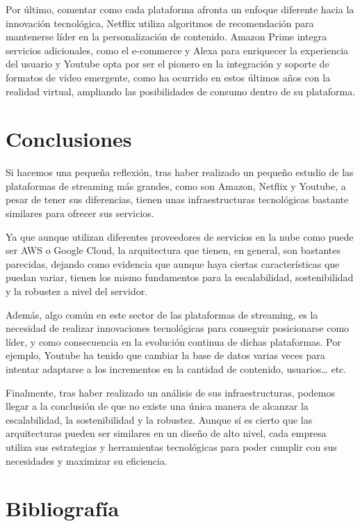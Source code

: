 \documentclass[12pt,a4paper]{article}
\begin{document}
Por último, comentar como cada plataforma afronta un enfoque diferente hacia la innovación tecnológica, Netflix utiliza algoritmos de recomendación para mantenerse líder en la personalización de contenido. Amazon Prime integra servicios adicionales, como el e-commerce y Alexa para enriquecer la experiencia del usuario y Youtube opta por ser el pionero en la integración y soporte de formatos de vídeo emergente, como ha ocurrido en estos últimos años con la realidad virtual, ampliando las posibilidades de consumo dentro de su plataforma.

\newpage 
\section{Conclusiones}

Si hacemos una pequeña reflexión, tras haber realizado un pequeño estudio de las plataformas de streaming más grandes, como son Amazon, Netflix y Youtube, a pesar de tener sus diferencias, tienen unas infraestructuras tecnológicas bastante similares para ofrecer sus servicios. 

Ya que aunque utilizan diferentes proveedores de servicios en la nube como puede ser AWS o Google Cloud, la arquitectura que tienen, en general, son bastantes parecidas, dejando como evidencia que aunque haya ciertas características que puedan variar, tienen los mismo fundamentos para la escalabilidad, sostenibilidad y la robustez a nivel del servidor.

Además, algo común en este sector de las plataformas de streaming, es la necesidad de realizar innovaciones tecnológicas para conseguir posicionarse como líder, y como consecuencia en la evolución continua de dichas plataformas. Por ejemplo, Youtube ha tenido que cambiar la base de datos varias veces para intentar adaptarse a los incrementos en la cantidad de contenido, usuarios… etc. \cite{benzina2019}

Finalmente, tras haber realizado un análisis de sus infraestructuras, podemos llegar a la conclusión de que no existe una única manera de alcanzar la escalabilidad, la sostenibilidad y la robustez. Aunque sí es cierto que las arquitecturas pueden ser similares en un diseño de alto nivel, cada empresa utiliza sus estrategias y herramientas tecnológicas para poder cumplir con sus necesidades y maximizar su eficiencia.


\newpage
\section{Bibliografía}
\end{document}
